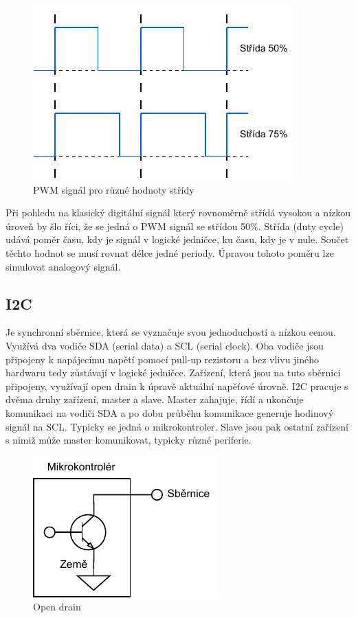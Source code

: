 \begin{figure}[h!]
	\centering
	\includegraphics[scale=1]{obrazky-figures/pwm_duty_cycle.pdf}
	\caption{PWM signál pro různé hodnoty střídy}
	\label{}
\end{figure}

Při pohledu na klasický digitální signál který rovnoměrně střídá vysokou a nízkou úroveň by šlo říci, že se jedná o PWM signál se střídou 50\%. Střída (duty cycle) udává poměr času, kdy je signál v logické jedničce, ku času, kdy je v nule. Součet těchto hodnot se musí rovnat délce jedné periody. Úpravou tohoto poměru lze simulovat analogový signál. \cite{embeded_robotics}

\subsection*{I2C}
Je synchronní sběrnice, která se vyznačuje svou jednoduchostí a nízkou cenou. Využívá dva vodiče SDA (serial data) a SCL (serial clock). Oba vodiče jsou připojeny k napájecímu napětí pomocí pull-up rezistoru a bez vlivu jiného hardwaru tedy zůstávají v logické jedničce. Zařízení, která jsou na tuto sběrnici připojeny, využívají open drain k úpravě aktuální napěťové úrovně. I2C pracuje s dvěma druhy zařízení, master a slave. Master zahajuje, řídí a ukončuje komunikaci na vodiči SDA a po dobu průběhu komunikace generuje hodinový signál na SCL. Typicky se jedná o mikrokontroler. Slave jsou pak ostatní zařízení s nimiž může master komunikovat, typicky různé periferie. \cite{embeded_robotics}

\begin{figure}[h!]
	\centering
	\includegraphics[scale=1]{obrazky-figures/open_drain.pdf}
	\caption{Open drain}
	\label{}
\end{figure}

